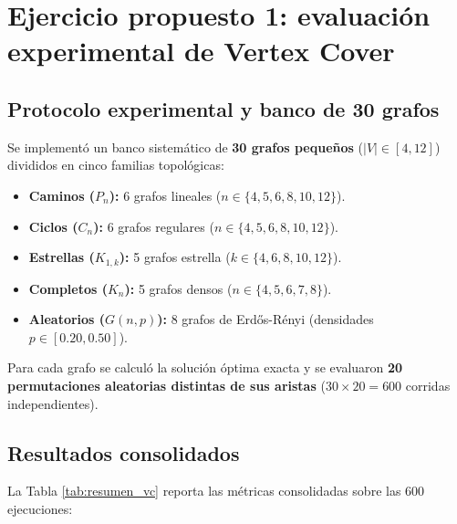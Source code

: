 \section{Ejercicio propuesto 1: evaluación experimental de Vertex Cover}

\subsection{Protocolo experimental y banco de 30 grafos}
Se implementó un banco sistemático de \textbf{30 grafos pequeños} ($|V| \in [4, 12]$) divididos en cinco familias topológicas:
\begin{itemize}
    \item \textbf{Caminos ($P_n$):} 6 grafos lineales ($n \in \{4, 5, 6, 8, 10, 12\}$).
    \item \textbf{Ciclos ($C_n$):} 6 grafos regulares ($n \in \{4, 5, 6, 8, 10, 12\}$).
    \item \textbf{Estrellas ($K_{1, k}$):} 5 grafos estrella ($k \in \{4, 6, 8, 10, 12\}$).
    \item \textbf{Completos ($K_n$):} 5 grafos densos ($n \in \{4, 5, 6, 7, 8\}$).
    \item \textbf{Aleatorios ($G(n, p)$):} 8 grafos de Erd\H{o}s-R\'enyi (densidades $p \in [0.20, 0.50]$).
\end{itemize}
Para cada grafo se calculó la solución óptima exacta y se evaluaron \textbf{20 permutaciones aleatorias distintas de sus aristas} ($30 \times 20 = 600$ corridas independientes).

\subsection{Resultados consolidados}
La Tabla \ref{tab:resumen_vc} reporta las métricas consolidadas sobre las 600 ejecuciones:

